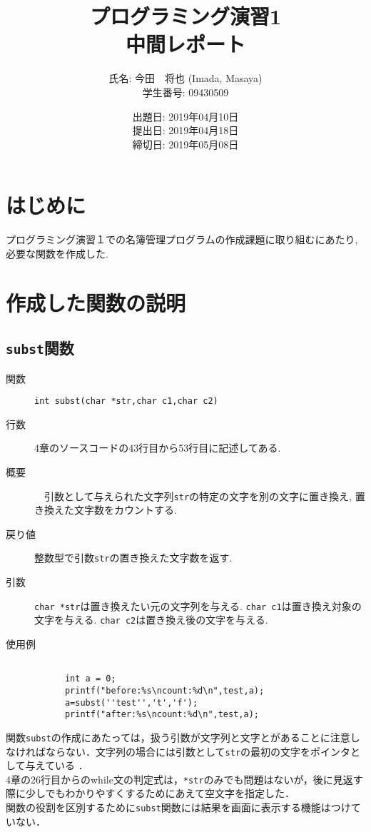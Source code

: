 \documentclass[a4j,11pt]{jarticle}
\title{プログラミング演習1 \\
       中間レポート}
\author{氏名: 今田　将也 (Imada, Masaya) \\
        学生番号: 09430509}
\date{出題日: 2019年04月10日 \\
      提出日: 2019年04月18日 \\
      締切日: 2019年05月08日 \\}  %
\begin{document}
\maketitle

\section{はじめに}
プログラミング演習１での名簿管理プログラムの作成課題に取り組むにあたり, 必要な関数を作成した. 

\section{作成した関数の説明}

\subsection{\texttt{subst}関数}
 \begin{description}
    \item[関数] \verb|int subst(char *str,char c1,char c2)|
    \item[行数]  4章のソースコードの43行目から53行目に記述してある.
    \item[概要]　引数として与えられた文字列\verb|str|の特定の文字を別の文字に置き換え, 置き換えた文字数をカウントする.
    \item[戻り値]整数型で引数\verb|str|の置き換えた文字数を返す.
    \item[引数]  \verb|char *str|は置き換えたい元の文字列を与える. \verb|char c1|は置き換え対象の文字を与える. \verb|char c2|は置き換え後の文字を与える.
    \item[使用例]
      \begin{verbatim}

      int a = 0;
      printf("before:%s\ncount:%d\n",test,a);
      a=subst(''test'','t','f');
      printf("after:%s\ncount:%d\n",test,a);
      \end{verbatim}
	
  \end{description}
関数\verb|subst|の作成にあたっては，扱う引数が文字列と文字とがあることに注意しなければならない．文字列の場合には引数として\verb|str|の最初の文字をポインタとして与えている
．\\4章の26行目からのwhile文の判定式は，\verb|*str|のみでも問題はないが，後に見返す際に少しでもわかりやすくするためにあえて空文字を指定した．\\関数の役割を区別するために\verb|subst|関数には結果を画面に表示する機能はつけていない．
\end{document}
